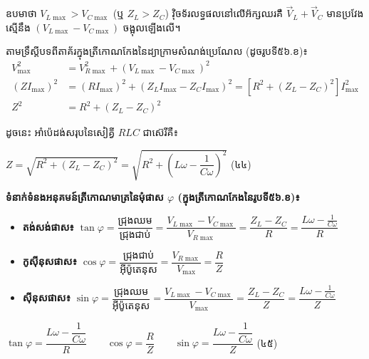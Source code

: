 \vspace{0.6em}
\noindent
ឧបមាថា $V_{L\max} > V_{C\max}$ (ឬ $Z_L > Z_C$) វ៉ិចទ័រលទ្ធផលនៅលើអ័ក្សឈរគឺ $\vec{V}_L + \vec{V}_C$ មានប្រវែងស្មើនឹង $(V_{L\max} - V_{C\max})$ ចង្អុលឡើងលើ។

\noindent
តាមទ្រឹស្តីបទពីតាគ័រក្នុងត្រីកោណកែងនៃដ្យាក្រាមសំណង់ប្រេណែល (ដូចរូបទី៥៦.ខ)៖
\begin{align*}
	V_{\max}^2 &= V_{R\max}^2 + (V_{L\max} - V_{C\max})^2 \\
	(Z I_{\max})^2 &= (R I_{\max})^2 + \left(Z_L I_{\max} - Z_C I_{\max}\right)^2 = \left[ R^2 + (Z_L - Z_C)^2 \right] I_{\max}^2 \\
	Z^2 &= R^2 + (Z_L - Z_C)^2
\end{align*}

ដូចនេះ អាំប៉េដង់សរុបនៃសៀគ្វី $RLC$ ជាស៊េរីគឺ៖
\begin{center}
	$\boxed{Z = \sqrt{R^2 + (Z_L - Z_C)^2} = \sqrt{R^2 + \left(L\omega - \dfrac{1}{C\omega}\right)^2}}$ \quad (៤៤)
\end{center}

\vspace{0.2em}
\noindent
\textbf{ទំនាក់ទំនងអនុគមន៍ត្រីកោណមាត្រនៃមុំផាស $\varphi$ (ក្នុងត្រីកោណកែងនៃរូបទី៥៦.ខ)៖}
\begin{itemize}[itemsep=1pt, topsep=1pt, parsep=0pt, leftmargin=1.5em]
	\item \textbf{តង់សង់ផាស៖} $\tan\varphi = \dfrac{\text{ជ្រុងឈម}}{\text{ជ្រុងជាប់}} = \dfrac{V_{L\max} - V_{C\max}}{V_{R\max}} = \dfrac{Z_L - Z_C}{R} = \dfrac{L\omega - \frac{1}{C\omega}}{R}$
	\item \textbf{កូស៊ីនុសផាស៖} $\cos\varphi = \dfrac{\text{ជ្រុងជាប់}}{\text{អ៊ីប៉ូតេនុស}} = \dfrac{V_{R\max}}{V_{\max}} = \dfrac{R}{Z}$
	\item \textbf{ស៊ីនុសផាស៖} $\sin\varphi = \dfrac{\text{ជ្រុងឈម}}{\text{អ៊ីប៉ូតេនុស}} = \dfrac{V_{L\max} - V_{C\max}}{V_{\max}} = \dfrac{Z_L - Z_C}{Z} = \dfrac{L\omega - \frac{1}{C\omega}}{Z}$
\end{itemize}

\begin{center}
	$\boxed{\tan\varphi = \dfrac{L\omega - \dfrac{1}{C\omega}}{R}} \qquad \boxed{\cos\varphi = \dfrac{R}{Z}} \qquad \boxed{\sin\varphi = \dfrac{L\omega - \dfrac{1}{C\omega}}{Z}}$ \quad (៤៥)
\end{center}

